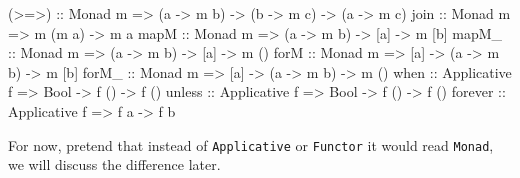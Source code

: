 \documentclass[11pt,
  american,
  DIV13]{article}
\newenvironment{Shaded}{}{}
\newcommand{\DataTypeTok}[1]{\textcolor[rgb]{0.56,0.13,0.00}{#1}}
\newcommand{\FunctionTok}[1]{\textcolor[rgb]{0.02,0.16,0.49}{#1}}
\newcommand{\NormalTok}[1]{#1}
\newcommand{\OtherTok}[1]{\textcolor[rgb]{0.00,0.44,0.13}{#1}}
\begin{document}
\begin{Shaded}
\begin{Highlighting}[]
\OtherTok{(\textgreater{}=\textgreater{})   ::} \DataTypeTok{Monad}\NormalTok{ m }\OtherTok{=\textgreater{}}\NormalTok{ (a }\OtherTok{{-}\textgreater{}}\NormalTok{ m b) }\OtherTok{{-}\textgreater{}}\NormalTok{ (b }\OtherTok{{-}\textgreater{}}\NormalTok{ m c) }\OtherTok{{-}\textgreater{}}\NormalTok{ (a }\OtherTok{{-}\textgreater{}}\NormalTok{ m c)}
\OtherTok{join    ::} \DataTypeTok{Monad}\NormalTok{ m }\OtherTok{=\textgreater{}}\NormalTok{ m (m a) }\OtherTok{{-}\textgreater{}}\NormalTok{ m a}
\FunctionTok{mapM}\OtherTok{    ::} \DataTypeTok{Monad}\NormalTok{ m }\OtherTok{=\textgreater{}}\NormalTok{ (a }\OtherTok{{-}\textgreater{}}\NormalTok{ m b) }\OtherTok{{-}\textgreater{}}\NormalTok{ [a] }\OtherTok{{-}\textgreater{}}\NormalTok{ m [b]}
\FunctionTok{mapM\_}\OtherTok{   ::} \DataTypeTok{Monad}\NormalTok{ m }\OtherTok{=\textgreater{}}\NormalTok{ (a }\OtherTok{{-}\textgreater{}}\NormalTok{ m b) }\OtherTok{{-}\textgreater{}}\NormalTok{ [a] }\OtherTok{{-}\textgreater{}}\NormalTok{ m ()}
\OtherTok{forM    ::} \DataTypeTok{Monad}\NormalTok{ m }\OtherTok{=\textgreater{}}\NormalTok{ [a] }\OtherTok{{-}\textgreater{}}\NormalTok{ (a }\OtherTok{{-}\textgreater{}}\NormalTok{ m b) }\OtherTok{{-}\textgreater{}}\NormalTok{ m [b]}
\OtherTok{forM\_   ::} \DataTypeTok{Monad}\NormalTok{ m }\OtherTok{=\textgreater{}}\NormalTok{ [a] }\OtherTok{{-}\textgreater{}}\NormalTok{ (a }\OtherTok{{-}\textgreater{}}\NormalTok{ m b) }\OtherTok{{-}\textgreater{}}\NormalTok{ m ()}
\OtherTok{when    ::} \DataTypeTok{Applicative}\NormalTok{ f }\OtherTok{=\textgreater{}} \DataTypeTok{Bool} \OtherTok{{-}\textgreater{}}\NormalTok{ f () }\OtherTok{{-}\textgreater{}}\NormalTok{ f ()}
\OtherTok{unless  ::} \DataTypeTok{Applicative}\NormalTok{ f }\OtherTok{=\textgreater{}} \DataTypeTok{Bool} \OtherTok{{-}\textgreater{}}\NormalTok{ f () }\OtherTok{{-}\textgreater{}}\NormalTok{ f ()}
\OtherTok{forever ::} \DataTypeTok{Applicative}\NormalTok{ f }\OtherTok{=\textgreater{}}\NormalTok{ f a }\OtherTok{{-}\textgreater{}}\NormalTok{ f b}
\end{Highlighting}
\end{Shaded}

For now, pretend that instead of \texttt{Applicative} or
\texttt{Functor} it would read \texttt{Monad}, we will discuss the
difference later.
\end{document}
